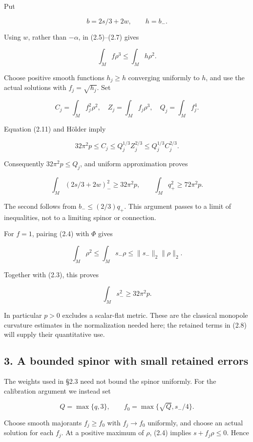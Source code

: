 \documentclass[
  11pt,
]{article}
\begin{document}
Put

\[
                  b=2s/3+2w,\qquad h=b_-.
\]

Using \(w\), rather than \(-\alpha\), in (2.5)--(2.7) gives

\[
                       \int_M f\rho^3\le\int_M h\rho^2.
 \tag{2.11}
\]

Choose positive smooth functions \(h_j\ge h\) converging uniformly to
\(h\), and use the actual solutions with \(f_j=\sqrt{h_j}\). Set

\[
 C_j=\int_M f_j^2\rho^2,\quad Z_j=\int_M f_j\rho^3,
 \quad Q_j=\int_M f_j^4.
\]

Equation (2.11) and Hölder imply

\[
 32\pi^2p\le C_j\le Q_j^{1/3}Z_j^{2/3}
                            \le Q_j^{1/3}C_j^{2/3}.
\]

Consequently \(32\pi^2p\le Q_j\), and uniform approximation proves

\[
 \int_M(2s/3+2w)_-^2\ge32\pi^2p,\qquad
 \int_M q_+^2\ge72\pi^2p.                               \tag{2.12}
\]

The second follows from \(b_-\le(2/3)q_+\). This argument passes to a
limit of inequalities, not to a limiting spinor or connection.

For \(f=1\), pairing (2.4) with \(\Phi\) gives

\[
 \int_M\rho^2\le\int_Ms_-\rho
        \le\|s_-\|_2\|\rho\|_2.
\]

Together with (2.3), this proves

\[
                        \int_Ms_-^2\ge32\pi^2p.          \tag{2.13}
\]

In particular \(p>0\) excludes a scalar-flat metric. These are the
classical monopole curvature estimates in the normalization needed here;
the retained terms in (2.8) will supply their quantitative use.

\hypertarget{a-bounded-spinor-with-small-retained-errors}{%
\subsection{3. A bounded spinor with small retained
errors}\label{a-bounded-spinor-with-small-retained-errors}}

The weights used in §2.3 need not bound the spinor uniformly. For the
calibration argument we instead set

\[
       Q=\max\{q,3\},\qquad
       f_0=\max\{\sqrt Q,s_-/4\}.                        \tag{3.1}
\]

Choose smooth majorants \(f_j\ge f_0\) with \(f_j\to f_0\) uniformly,
and choose an actual solution for each \(f_j\). At a positive maximum of
\(\rho\), (2.4) implies \(s+f_j\rho\le0\). Hence
\end{document}
